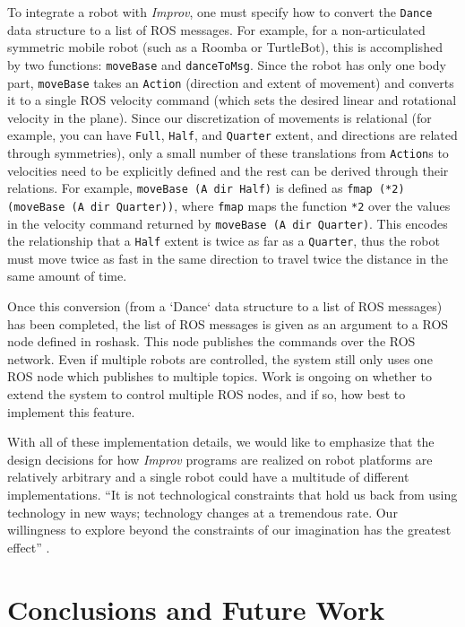 \documentclass[sigconf]{acmart}
\begin{document}
To integrate a robot with \emph{Improv}, one must
specify how to convert the \texttt{Dance} data structure to a list of ROS
messages. For example, for a non-articulated symmetric mobile robot (such as a Roomba or
TurtleBot), this is accomplished by two functions: \texttt{moveBase} and
\texttt{danceToMsg}. Since the robot has only one body part, \texttt{moveBase}
takes an \texttt{Action} (direction and extent of movement) and converts it to a
single ROS velocity command (which sets the desired linear and rotational
velocity in the plane). Since our discretization of movements is relational (for
example, you can have \texttt{Full}, \texttt{Half}, and \texttt{Quarter} extent,
and directions are related through symmetries), only a small number of these
translations from \texttt{Action}s to velocities need to be explicitly defined
and the rest can be derived through their relations. For example,
\texttt{moveBase (A dir Half)} is defined as \texttt{fmap (*2) (moveBase (A dir
Quarter))},
where \texttt{fmap} maps the function \texttt{*2} over the values in the velocity
command returned by \texttt{moveBase (A dir Quarter)}. This encodes the relationship
that a \texttt{Half} extent is twice as far as a \texttt{Quarter}, thus the
robot must move twice as fast in the same direction to travel twice the distance
in the same amount of time.

Once this conversion (from a `Dance` data structure to a list of ROS messages)
has been completed, the list of ROS messages is given as an argument to a ROS
node defined in roshask. This node publishes the commands over the ROS network.
Even if multiple robots are controlled, the system still only uses one ROS node
which publishes to multiple topics. Work is ongoing on whether to extend the
system to control multiple ROS nodes, and if so, how best to implement this
feature.

With all of these implementation details, we would like to emphasize
that the design decisions for how \emph{Improv} programs are realized on
robot platforms are relatively arbitrary and a single robot could have a
multitude of different implementations. ``It is not technological
constraints that hold us back from using technology in new ways;
technology changes at a tremendous rate. Our willingness to explore
beyond the constraints of our imagination has the greatest effect''
\cite{schiphorst}.


\section{Conclusions and Future
Work}\label{conclusions-and-future-work}
\end{document}
